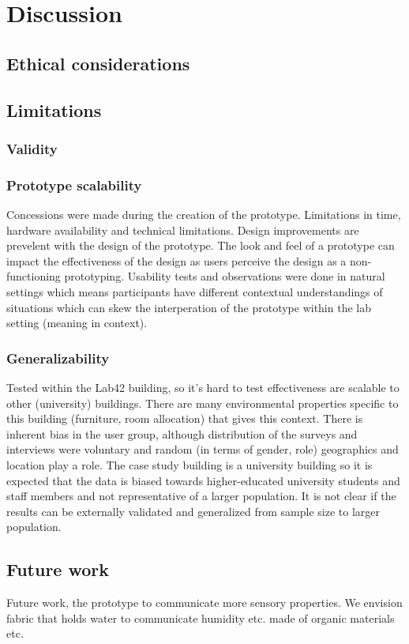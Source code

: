\section{Discussion}
\label{sec:discussion}

\subsection{Ethical considerations}

\subsection{Limitations}

\subsubsection{Validity}


\subsubsection{Prototype scalability}
Concessions were made during the creation of the prototype. Limitations in time, hardware availability and technical limitations. Design improvements are prevelent with the design of the prototype. The look and feel of a prototype can impact the effectiveness of the design as users perceive the design as a non-functioning prototyping. Usability tests and observations were done in natural settings which means participants have different contextual understandings of situations which can skew the interperation of the prototype within the lab setting (meaning in context).

\subsubsection{Generalizability}
Tested within the Lab42 building, so it's hard to test effectiveness are scalable to other (university) buildings. There are many environmental properties specific to this building (furniture, room allocation) that gives this context. There is inherent bias in the user group, although distribution of the surveys and interviews were voluntary and random (in terms of gender, role) geographics and location play a role. The case study building is a university building so it is expected that the data is biased towards higher-educated university students and staff members and not representative of a larger population. It is not clear if the results can be externally validated and generalized from sample size to larger population.

\subsection{Future work}

Future work, the prototype to communicate more sensory properties. We envision fabric that holds water to communicate humidity etc. made of organic materials etc.